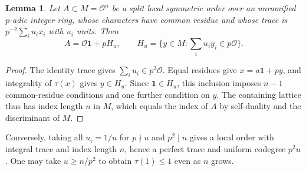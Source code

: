 \documentclass[11pt,a4paper]{article}
\numberwithin{equation}{section}
\newtheorem{lemma}[theorem]{Lemma}
\theoremstyle{remark}
\newcommand{\OO}{\mathcal O}
\begin{document}
\begin{lemma}\label{fam:M:5.1}\label{def:uniform-split-order}
Let $A\subset M=\OO^n$ be a split local symmetric order over an
unramified $p$-adic integer ring, whose characters have common
residue and whose trace is $p^{-2}\sum_i u_i x_i$ with $u_i$ units.
Then
\[
 A=\OO\mathbf1+pH_u,\qquad
 H_u=\{y\in M:\textstyle\sum_i u_i y_i\in p\OO\}.
\]
\end{lemma}
\begin{proof}
The identity trace gives $\sum_i u_i\in p^2\OO$. Equal residues
give $x=a\mathbf1+py$, and integrality of $\tau(x)$ gives
$y\in H_u$. Since $\mathbf1\in H_u$, this inclusion imposes
$n-1$ common-residue conditions and one further condition on $y$.
The containing lattice thus has index length $n$ in $M$, which
equals the index of $A$ by self-duality and the discriminant of $M$.
\end{proof}
Conversely, taking all $u_i=1/u$ for $p\nmid u$ and $p^2\mid n$
gives a local order with integral trace and index length $n$, hence
a perfect trace and uniform codegree $p^2u$. One may take $u\ge n/p^2$
to obtain $\tau(1)\le1$ even as $n$ grows.
\end{document}
